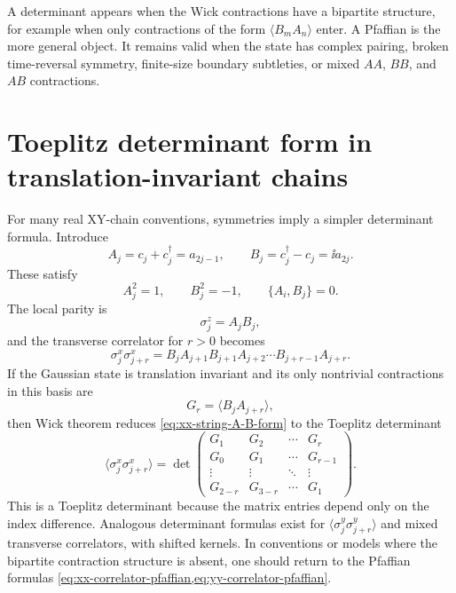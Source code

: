 \begin{remark}
A determinant appears when the Wick contractions have a bipartite structure, for
example when only contractions of the form $\langle B_mA_n\rangle$ enter.  A
Pfaffian is the more general object.  It remains valid when the state has complex
pairing, broken time-reversal symmetry, finite-size boundary subtleties, or mixed
$AA$, $BB$, and $AB$ contractions.
\end{remark}

\section{Toeplitz determinant form in translation-invariant chains}
\label{sec:toeplitz-determinant-translation-invariant}

For many real XY-chain conventions, symmetries imply a simpler determinant
formula.  Introduce
\begin{equation}
\label{eq:A-B-operators-toeplitz}
    A_j=c_j+c_j^\dagger=a_{2j-1},
    \qquad
    B_j=c_j^\dagger-c_j=\ii a_{2j}.
\end{equation}
These satisfy
\begin{equation}
    A_j^2=1,
    \qquad
    B_j^2=-1,
    \qquad
    \{A_i,B_j\}=0.
\end{equation}
The local parity is
\begin{equation}
    \sigma_j^z=A_jB_j,
\end{equation}
and the transverse correlator for $r>0$ becomes
\begin{equation}
\label{eq:xx-string-A-B-form}
    \sigma_j^x\sigma_{j+r}^x
    =
    B_jA_{j+1}B_{j+1}A_{j+2}\cdots B_{j+r-1}A_{j+r}.
\end{equation}
If the Gaussian state is translation invariant and its only nontrivial
contractions in this basis are
\begin{equation}
\label{eq:G-r-definition-toeplitz}
    G_r=\langle B_jA_{j+r}\rangle,
\end{equation}
then Wick theorem reduces \cref{eq:xx-string-A-B-form} to the Toeplitz
determinant
\begin{equation}
\label{eq:xx-toeplitz-determinant}
    \langle \sigma_j^x\sigma_{j+r}^x\rangle
    =
    \det
    \begin{pmatrix}
        G_1&G_2&\cdots&G_r\\
        G_0&G_1&\cdots&G_{r-1}\\
        \vdots&\vdots&\ddots&\vdots\\
        G_{2-r}&G_{3-r}&\cdots&G_1
    \end{pmatrix}.
\end{equation}
This is a Toeplitz determinant because the matrix entries depend only on the
index difference.  Analogous determinant formulas exist for
$\langle\sigma_j^y\sigma_{j+r}^y\rangle$ and mixed transverse correlators, with
shifted kernels.  In conventions or models where the bipartite contraction
structure is absent, one should return to the Pfaffian formulas
\cref{eq:xx-correlator-pfaffian,eq:yy-correlator-pfaffian}.

